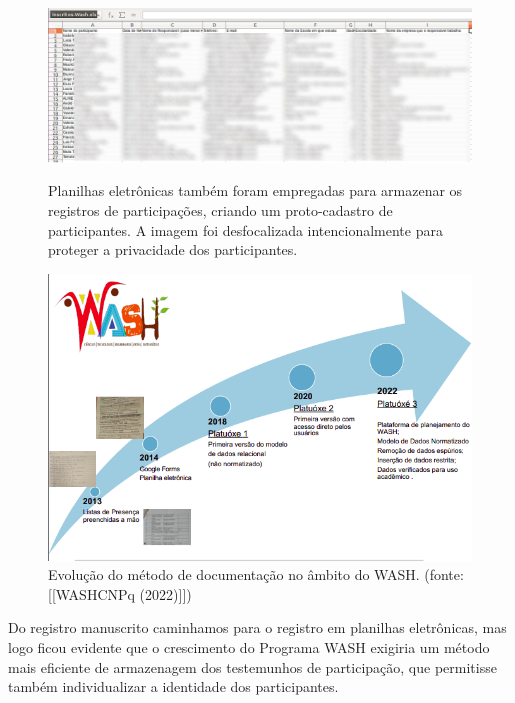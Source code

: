 \documentclass[
12pt,		%
openright,	%
twoside,  %
a4paper,			%
chapter=TITLE,		%
english,			%
french,				%
spanish,			%
brazil				%
]{USPSC-classe/USPSC}
\begin{document}
\begin{figure}[max size={\textwidth}{\textheight}]
\begin{minipage}[b]{0.4\linewidth}
        \centering
                \includegraphics[width=1.0\linewidth]{../../imagens/blurred-planilha2.png}
                \caption{Planilhas eletr\^onicas tamb\'em foram empregadas para armazenar os registros de participa\c{c}\~oes, criando um proto-cadastro de participantes. A imagem foi desfocalizada intencionalmente para proteger a privacidade dos participantes.}
                \label{b43907f0fa6b6fb935e7384ab03b508859ff0609}
\end{minipage}%
\hspace{0.5cm}
\begin{minipage}[b]{0.4\linewidth}
        \centering
                \includegraphics[width=1.0\linewidth]{../../imagens/evolucao-da-documentacao.png}
                \caption{Evolu\c{c}\~ao do m\'etodo de documenta\c{c}\~ao no \^ambito do WASH. (fonte:  [[WASHCNPq (2022)]])}
                \label{d237f9364cfe04892cbdffff7fea732012fa5804}
\end{minipage}
\hspace{0.5cm}
\end{figure}



Do registro manuscrito caminhamos para o registro em planilhas eletr\^onicas, mas logo ficou evidente que o crescimento do Programa WASH exigiria um m\'etodo mais eficiente de armazenagem dos testemunhos de participa\c{c}\~ao, que permitisse tamb\'em individualizar a identidade dos participantes.
\end{document}
